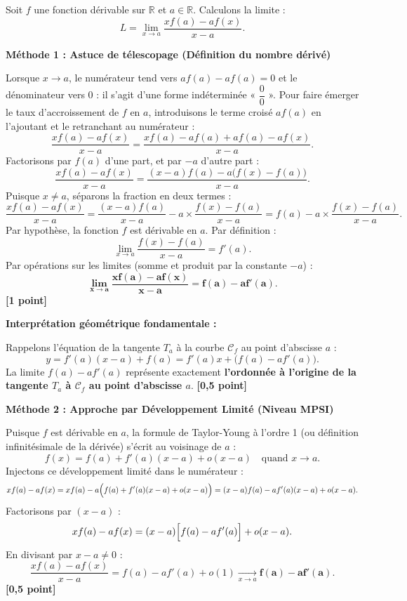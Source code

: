 \documentclass[11pt,a4paper]{article}
\newcommand{\R}{\mathbb{R}}
\begin{document}
\begin{bonusbox}
Soit $f$ une fonction dérivable sur $\R$ et $a \in \R$. Calculons la limite :
\[
L = \lim_{x \to a} \frac{x f(a) - a f(x)}{x - a}.
\]

\textbf{Méthode 1 : Astuce de télescopage (Définition du nombre dérivé)}

Lorsque $x \to a$, le numérateur tend vers $a f(a) - a f(a) = 0$ et le dénominateur vers $0$ : il s'agit d'une forme indéterminée « $\dfrac{0}{0}$ ».
Pour faire émerger le taux d'accroissement de $f$ en $a$, introduisons le terme croisé $a f(a)$ en l'ajoutant et le retranchant au numérateur :
\[
\frac{x f(a) - a f(x)}{x - a} = \frac{x f(a) - a f(a) + a f(a) - a f(x)}{x - a}.
\]
Factorisons par $f(a)$ d'une part, et par $-a$ d'autre part :
\[
\frac{x f(a) - a f(x)}{x - a} = \frac{(x - a)f(a) - a\bigl(f(x) - f(a)\bigr)}{x - a}.
\]
Puisque $x \neq a$, séparons la fraction en deux termes :
\[
\frac{x f(a) - a f(x)}{x - a} = \frac{(x - a)f(a)}{x - a} - a \times \frac{f(x) - f(a)}{x - a} = f(a) - a \times \frac{f(x) - f(a)}{x - a}.
\]
Par hypothèse, la fonction $f$ est dérivable en $a$. Par définition :
\[
\lim_{x \to a} \frac{f(x) - f(a)}{x - a} = f'(a).
\]
Par opérations sur les limites (somme et produit par la constante $-a$) :
\[
\mathbf{\lim_{x \to a} \frac{x f(a) - a f(x)}{x - a} = f(a) - a f'(a)}.
\] \hfill \textbf{[1 point]}

\medskip
\textbf{Interprétation géométrique fondamentale :}

Rappelons l'équation de la tangente $T_a$ à la courbe $\mathcal{C}_f$ au point d'abscisse $a$ :
\[
y = f'(a)(x - a) + f(a) = f'(a)x + \bigl(f(a) - a f'(a)\bigr).
\]
La limite $f(a) - a f'(a)$ représente exactement \textbf{l'ordonnée à l'origine de la tangente $T_a$ à $\mathcal{C}_f$ au point d'abscisse $a$}. \hfill \textbf{[0{,}5 point]}

\medskip
\textbf{Méthode 2 : Approche par Développement Limité (Niveau MPSI)}

Puisque $f$ est dérivable en $a$, la formule de Taylor-Young à l'ordre 1 (ou définition infinitésimale de la dérivée) s'écrit au voisinage de $a$ :
\[
f(x) = f(a) + f'(a)(x - a) + o(x - a) \quad \text{quand } x \to a.
\]
Injectons ce développement limité dans le numérateur :
\[
x f(a) - a f(x) = x f(a) - a\Bigl(f(a) + f'(a)(x - a) + o(x - a)\Bigr) = (x - a)f(a) - a f'(a)(x - a) + o(x - a).
\]
Factorisons par $(x - a)$ :
\[
x f(a) - a f(x) = (x - a)\Bigl[ f(a) - a f'(a) \Bigr] + o(x - a).
\]
En divisant par $x - a \neq 0$ :
\[
\frac{x f(a) - a f(x)}{x - a} = f(a) - a f'(a) + o(1) \xrightarrow[x \to a]{} \mathbf{f(a) - a f'(a)}.
\] \hfill \textbf{[0{,}5 point]}
\end{bonusbox}
\end{document}
